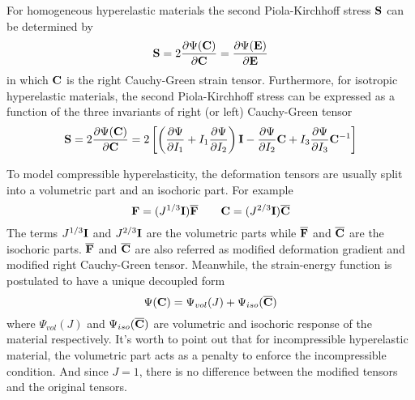 For homogeneous hyperelastic materials the second Piola-Kirchhoff stress $\bold{S}$ can be determined by 
\begin{equation}
\bold{S} = 2\frac{\partial\Psi(\bold{C})}{\partial{\bold{C}}} = \frac{\partial\Psi(\bold{E})}{\partial{\bold{E}}}
\end{equation}
in which $\bold{C}$ is the right Cauchy-Green strain tensor. Furthermore, for isotropic hyperelastic materials, the second Piola-Kirchhoff stress can be expressed as a function of the three invariants of right (or left) Cauchy-Green tensor
\begin{equation} \label{PK2}
\bold{S} = 2\frac{\partial\Psi({\bold{C})}}{\partial{\bold{C}}} = 2\left[\left( \frac{\partial\Psi}{\partial{I_1}} + I_1 \frac{\partial\Psi}{\partial{I_2}} \right)\bold{I} -  \frac{\partial\Psi}{\partial{I_2}}\bold{C} + I_3 \frac{\partial\Psi}{\partial{I_3}}{\bold{C}}^{-1} \right]
\end{equation}

To model compressible hyperelasticity, the deformation tensors are usually split into a volumetric part and an isochoric part. For example
\begin{equation} \label{split1}
\bold{F} = (J^{1/3}\bold{I})\overline{\bold{F}}
\qquad
\bold{C} = (J^{2/3}\bold{I})\overline{\bold{C}}
\end{equation}
The terms $J^{1/3}\bold{I}$ and $J^{2/3}\bold{I}$ are the volumetric parts while $\overline{\bold{F}}$ and $\overline{\bold{C}}$ are the isochoric parts. $\overline{\bold{F}}$ and $\overline{\bold{C}}$ are also referred as modified deformation gradient and modified right Cauchy-Green tensor. Meanwhile, the strain-energy function is postulated to have a unique decoupled form
\begin{equation} \label{split2}
\Psi(\bold{C}) = \Psi_{vol}(J) + \Psi_{iso}(\overline{\bold{C}})
\end{equation}
where $\Psi_{vol}(J)$ and $\Psi_{iso}(\overline{\bold{C}})$ are volumetric and isochoric response of the material respectively. It's worth to point out that for incompressible hyperelastic material, the volumetric part acts as a penalty to enforce the incompressible condition. And since $J = 1$, there is no difference between the modified tensors and the original tensors.

